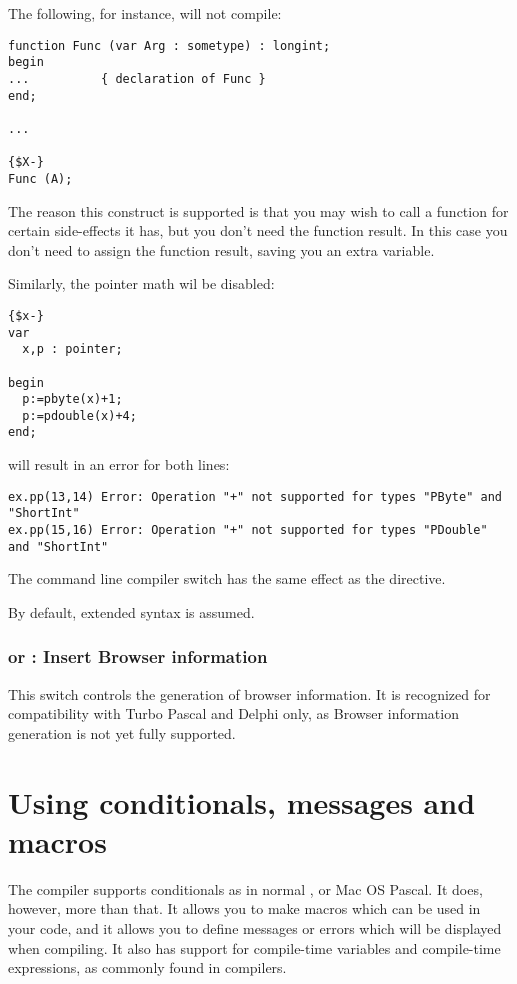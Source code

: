 The following, for instance, will not compile:
\begin{verbatim}
function Func (var Arg : sometype) : longint;
begin
...          { declaration of Func }
end;

...

{$X-}
Func (A);
\end{verbatim}
The reason this construct is supported is that you may wish to call a
function for certain side-effects it has, but you don't need the function
result. In this case you don't need to assign the function result, saving
you an extra variable.

Similarly, the pointer math wil be disabled:
\begin{verbatim}
{$x-}
var
  x,p : pointer;

begin
  p:=pbyte(x)+1;
  p:=pdouble(x)+4;
end;
\end{verbatim}
will result in an error for both lines:
\begin{verbatim}
ex.pp(13,14) Error: Operation "+" not supported for types "PByte" and "ShortInt"                                                            
ex.pp(15,16) Error: Operation "+" not supported for types "PDouble" and "ShortInt"
\end{verbatim}

The command line compiler switch  has the same effect as the
 directive.

By default, extended syntax is assumed.

\subsection{ or  : Insert Browser information}

This switch controls the generation of browser information. It is recognized
for compatibility with Turbo Pascal and Delphi only, as Browser information
generation is not yet fully supported.


\chapter{Using conditionals, messages and macros}
\label{ch:CondMessageMacro}
The \fpc compiler supports conditionals as in normal \tp, \delphi or Mac OS
Pascal. It does, however, more than that. It allows you to make macros which can be used in
your code, and it allows you to define messages or errors which will be
displayed when compiling. It also has support for compile-time variables and
compile-time expressions, as commonly found in \macos compilers.

